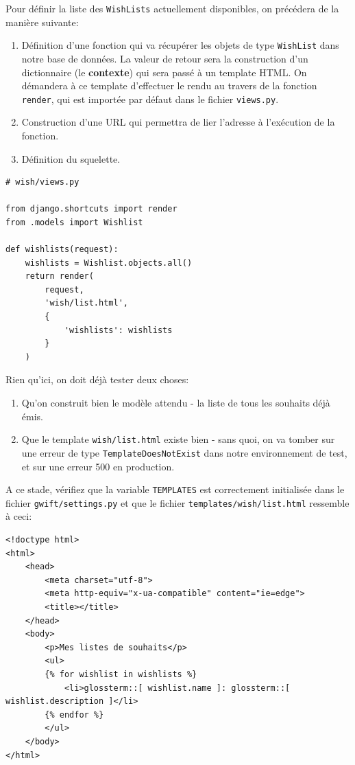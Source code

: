 \documentclass[11pt]{amsbook}
\begin{document}
Pour définir la liste des \texttt{WishLists}  actuellement disponibles, on précédera de la manière suivante:


\begin{enumerate}

\item{Définition d’une fonction qui va récupérer les objets de type \texttt{WishList} dans notre base de données. La valeur de retour sera la construction d’un dictionnaire (le \textbf{contexte}) qui sera passé à un template HTML. On démandera à ce template d’effectuer le rendu au travers de la fonction \texttt{render}, qui est importée par défaut dans le fichier \texttt{views.py}.}

\item{Construction d’une URL qui permettra de lier l’adresse à l’exécution de la fonction.}

\item{Définition du squelette.}

\end{enumerate}


\begin{verbatim}
# wish/views.py

from django.shortcuts import render
from .models import Wishlist

def wishlists(request):
	wishlists = Wishlist.objects.all()
	return render(
		request,
		'wish/list.html',
		{
			'wishlists': wishlists
		}
	)
\end{verbatim}

Rien qu’ici, on doit déjà tester deux choses:


\begin{enumerate}

\item{Qu’on construit bien le modèle attendu - la liste de tous les souhaits déjà émis.}

\item{Que le template \texttt{wish/list.html} existe bien - sans quoi, on va tomber sur une erreur de type \texttt{TemplateDoesNotExist} dans notre environnement de test, et sur une erreur 500 en production.}

\end{enumerate}


A ce stade, vérifiez que la variable \texttt{TEMPLATES} est correctement initialisée dans le fichier \texttt{gwift/settings.py} et que le fichier \texttt{templates/wish/list.html} ressemble à ceci:


\begin{verbatim}
<!doctype html>
<html>
	<head>
		<meta charset="utf-8">
		<meta http-equiv="x-ua-compatible" content="ie=edge">
		<title></title>
	</head>
	<body>
		<p>Mes listes de souhaits</p>
		<ul>
		{% for wishlist in wishlists %}
			<li>glossterm::[ wishlist.name ]: glossterm::[ wishlist.description ]</li>
		{% endfor %}
		</ul>
	</body>
</html>
\end{verbatim}
\end{document}
